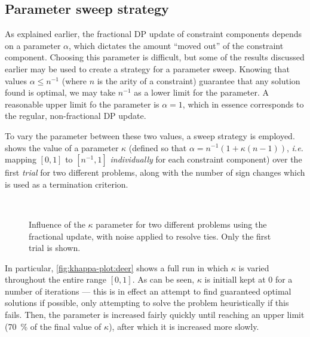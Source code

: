 \subsection{Parameter sweep strategy}
As explained earlier, the fractional DP update of constraint components depends on a parameter \(\alpha\), which dictates the amount \enquote{moved out} of the constraint component.
Choosing this parameter is difficult, but some of the results discussed earlier may be used to create a strategy for a parameter sweep.
Knowing that values \(\alpha\leq n^{-1}\) (where \(n\) is the arity of a constraint) guarantee that any solution found is optimal, we may take \(n^{-1}\) as a lower limit for the parameter.
A reasonable upper limit fo the parameter is \(\alpha=1\), which in essence corresponds to the regular, non-fractional DP update.

To vary the parameter between these two values, a sweep strategy is employed.
 shows the value of a parameter \(\kappa\) (defined so that \(\alpha = n^{-1}\left(1 + \kappa(n - 1)\right)\), \emph{i.e.} mapping \(\left[0,1\right]\) to \(\left[n^{-1},1\right]\) \emph{individually} for each constraint component) over the first \emph{trial} for two different problems, along with the number of sign changes which is used as a termination criterion.

\begin{figure}[p]
	\centering
	\\
	\caption{Influence of the \(\kappa\) parameter for two different problems using the fractional update, with noise applied to resolve ties. Only the first trial is shown.}
	\label{fig:khappa-plot}
\end{figure}

In particular, \cref{fig:khappa-plot:deer} shows a full run in which \(\kappa\) is varied throughout the entire range \([0,1]\).
As can be seen, \(\kappa\) is initiall kept at 0 for a number of iterations --- this is in effect an attempt to find guaranteed optimal solutions if possible, only attempting to solve the problem heuristically if this fails.
Then, the parameter is increased fairly quickly until reaching an upper limit (\SI{70}{\percent} of the final value of \(\kappa\)), after which it is increased more slowly.

